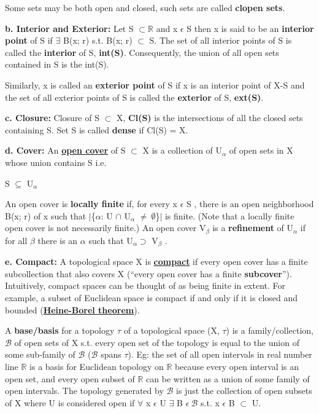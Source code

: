 Some sets may be both open and closed, such sets are called \textbf{clopen sets}.

\textbf{b. Interior and Exterior: } Let S $\subset \mathbb{R}$ and x $\epsilon$ S then x is said to be an \textbf{interior point} of S if 
$\exists$ B(x; r) s.t. B(x; r) $\subset$ S. The set of all interior points of S is called the \textbf{interior} of S, \textbf{int(S)}.
Consequently, the union of all open sets contained in S is the int(S).

Similarly, x is called an \textbf{exterior point} of S if x is an interior point of X-S and the set of all exterior points of S
is called the \textbf{exterior} of S, \textbf{ext(S)}.

\textbf{c. Closure: } Closure of S $\subset$ X, \textbf{Cl(S)} is the intersections of all the closed sets containing S.
Set S is called \textbf{dense} if Cl(S) = X.

\textbf{d. Cover: } An \href{https://en.wikipedia.org/wiki/Cover_(topology)}{\textbf{open cover}} of S $\subset$ X is a collection of {U$_\alpha$} of open sets in X
whose union contains S i.e.
\begin{center}
    S $\subseteq$ U$_\alpha$
\end{center}
An open cover is \textbf{locally finite} if, for every x $\epsilon$ S , there is an open neighborhood B(x; r) of x
such that $\lvert$\{$\alpha$: U $\cap$ U$_\alpha$ $\neq \: \emptyset $\}$\rvert$ is finite. (Note that a locally finite open cover is not
necessarily finite.) An open cover {V$_\beta$ } is a \textbf{refinement} of {U$_\alpha$} if for all $\beta$ there is
an $\alpha$ such that U$_\alpha \supset$ V$_\beta$ .

\textbf{e. Compact: } A topological space X is \href{https://blogs.scientificamerican.com/roots-of-unity/what-does-compactness-really-mean/}{\textbf{compact}}
if every open cover has a finite subcollection that also covers X (“every open cover has a finite \textbf{subcover}”). 
Intuitively, compact spaces can be thought of as being finite in extent. 
For example, a subset of Euclidean space is compact if and only if it is closed and
bounded (\href{https://en.wikipedia.org/wiki/Heine%E2%80%93Borel_theorem}{\textbf{Heine-Borel theorem}}).

A \textbf{base/basis} for a topology $\tau$ of a topological space (X, $\tau$) is a family/collection, $\mathcal{B}$ of 
open sets of X s.t. every open set of the topology is equal to the union of some sub-family of $\mathcal{B}$ ($\mathcal{B}$ spans $\tau$).
Eg: the set of all open intervals in real number line $\mathbb{R}$ is a basis for Euclidean topology on $\mathbb{R}$ because every open
interval is an open set, and every open subset of $\mathbb{R}$ can be written as a union of some family of open intervals. The topology generated by $\mathcal{B}$ is just the collection of  open subsets of X where U is considered open
if $\forall$ x $\epsilon$ U $\exists$ B $\epsilon \: \mathcal{B}$ s.t. x $\epsilon$ B $\subset$ U.

